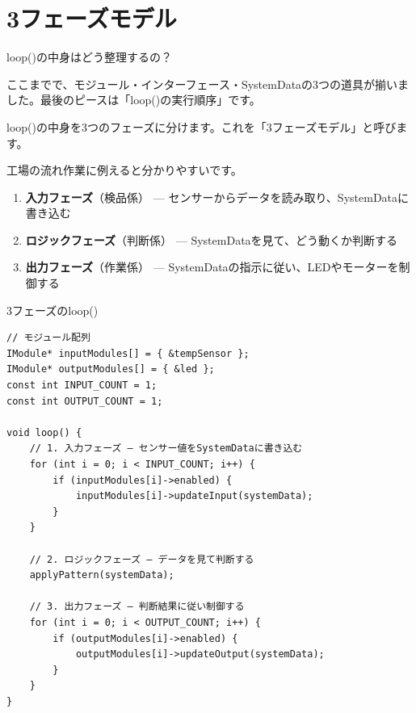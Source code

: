 \section{3フェーズモデル}

\begin{qabox}{loop()の中身はどう整理するの？}

ここまでで、モジュール・インターフェース・SystemDataの3つの道具が揃いました。最後のピースは「loop()の実行順序」です。

loop()の中身を3つのフェーズに分けます。これを「3フェーズモデル」と呼びます。

\begin{center}
\end{center}

工場の流れ作業に例えると分かりやすいです。

\begin{enumerate}
  \item \textbf{入力フェーズ}（検品係） — センサーからデータを読み取り、SystemDataに書き込む
  \item \textbf{ロジックフェーズ}（判断係） — SystemDataを見て、どう動くか判断する
  \item \textbf{出力フェーズ}（作業係） — SystemDataの指示に従い、LEDやモーターを制御する
\end{enumerate}

\begin{goodexample}{3フェーズのloop()}
\begin{lstlisting}
// モジュール配列
IModule* inputModules[] = { &tempSensor };
IModule* outputModules[] = { &led };
const int INPUT_COUNT = 1;
const int OUTPUT_COUNT = 1;

void loop() {
    // 1. 入力フェーズ — センサー値をSystemDataに書き込む
    for (int i = 0; i < INPUT_COUNT; i++) {
        if (inputModules[i]->enabled) {
            inputModules[i]->updateInput(systemData);
        }
    }

    // 2. ロジックフェーズ — データを見て判断する
    applyPattern(systemData);

    // 3. 出力フェーズ — 判断結果に従い制御する
    for (int i = 0; i < OUTPUT_COUNT; i++) {
        if (outputModules[i]->enabled) {
            outputModules[i]->updateOutput(systemData);
        }
    }
}
\end{lstlisting}
\end{goodexample}

\end{qabox}

